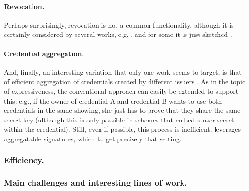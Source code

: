 \paragraph{Revocation.} %
Perhaps surprisingly, revocation is not a common functionality, although it is
certainly considered by several works, e.g. \cite{cl01,cks10,ckl+15}, and for
some it is just sketched \cite{hs21}.

\paragraph{Credential aggregation.} %
And, finally, an interesting variation that only one work seems to target,
is that of efficient aggregation of credentials created by different issuers
\cite{cl11}. As in the topic of expressiveness, the conventional approach
can easily be extended to support this: e.g., if the owner of credential A and
credential B wants to use both credentials in the same showing, she just has to
prove that they share the same secret key (although this is only possible in
schemes that embed a user secret within the credential). Still, even if
possible, this process is inefficient. \cite{cl11} leverages aggregatable
signatures, which target precisely that setting.

\subsubsection{Efficiency.}
%

\subsubsection{Main challenges and interesting lines of work.}
%

